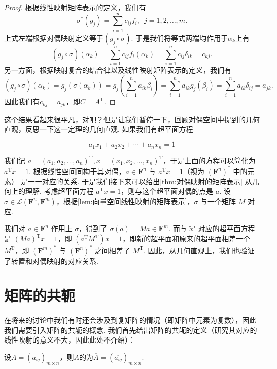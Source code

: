 \begin{proof}
    根据线性映射矩阵表示的定义，我们有
    \[\sigma^*(g_j)=\sum_{i=1}^nc_{ij}f_i,\enspace j=1,2,\ldots,m.\]
    上式左端根据对偶映射定义等于$(g_j\circ\sigma)$. 于是我们将等式两端均作用于$\alpha_k$上有
    \[(g_j\circ\sigma)(\alpha_k)=\sum_{i=1}^nc_{ij}f_i(\alpha_k)=\sum_{i=1}^nc_{ij}\delta_{ik}=c_{kj}.\]
    另一方面，根据映射复合的结合律以及线性映射矩阵表示的定义，我们有
    \[(g_j\circ\sigma)(\alpha_k)=g_j(\sigma(\alpha_k))=g_j\left(\sum_{i=1}^na_{ik}\beta_i\right)=\sum_{i=1}^na_{ik}g_j(\beta_i)=\sum_{i=1}^na_{ik}\delta_{ij}=a_{jk}.\]
    因此我们有$c_{kj}=a_{jk}$，即$C=A^\mathrm{T}$.
\end{proof}

这个结果看起来很平凡，对吧？但是让我们暂停一下，回顾对偶空间中提到的几何直观，反思一下这一定理的几何直观. 如果我们有超平面方程

\[
    a_1 x_1 + a_2 x_2 + \cdots + a_n x_n = 1
\]

我们记 $a = (a_1,a_2,\ldots,a_n)^\mathrm{T}, x = (x_1,x_2,\ldots,x_n)^\mathrm{T}$，于是上面的方程可以简化为 $a^\mathrm{T} x = 1$. 根据线性空间同构于其对偶，$a \in \mathbf{F}^n$ 与 $a^\mathrm{T} x = 1$（视为 $(\mathbf{F}^n)^*$ 中的元素） 是一一对应的关系. 于是我们接下来可以给出\autoref{thm:对偶映射的矩阵表示} 从几何上的理解. 考虑超平面方程 $a^\mathrm{T} x = 1$，则与这个超平面对偶的点是 $a$. 设 $\sigma \in \mathcal{L}(\mathbf{F}^n,\mathbf{F}^m)$，根据\autoref{lem:向量空间线性映射的矩阵表示}，$\sigma$ 与一个矩阵 $M$ 对应.

我们对 $a \in \mathbf{F}^n$ 作用上 $\sigma$，得到了 $\sigma(a) = Ma \in \mathbf{F}^m$. 而与 $\tilde{x}'$ 对应的超平面方程是 $(Ma)^\mathrm{T} x = 1$，即 $(a^\mathrm{T}M^\mathrm{T}) x = 1$，即新的超平面和原来的超平面相差一个 $M^\mathrm{T}$，即 $(\mathbf{F}^m)^*$ 与 $(\mathbf{F}^n)^*$ 之间相差了 $M^\mathrm{T}$. 因此，从几何直观上，我们也验证了转置和对偶映射的对应关系.

\section{矩阵的共轭}

在将来的讨论中我们有时还会涉及到复矩阵的情况（即矩阵中元素为复数），因此我们需要引入矩阵的共轭的概念. 我们首先给出矩阵的共轭的定义（研究其对应的线性映射的意义不大，因此此处不介绍）：
\begin{definition}{}{}
    设$A=(a_{ij})_{m \times n}$，则$A$的为$\overline{A}=(\overline{a_{ij}})_{m \times n}$.
\end{definition}

